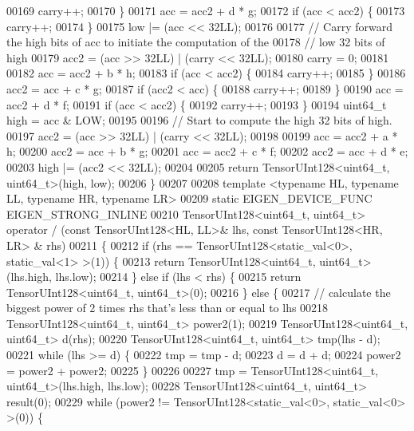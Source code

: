 \begin{DoxyCode}
00169     carry++;
00170   \}
00171   acc = acc2 + d * g;
00172   \textcolor{keywordflow}{if} (acc < acc2) \{
00173     carry++;
00174   \}
00175   low |= (acc << 32LL);
00176 
00177   \textcolor{comment}{// Carry forward the high bits of acc to initiate the computation of the}
00178   \textcolor{comment}{// low 32 bits of high}
00179   acc2 = (acc >> 32LL) | (carry << 32LL);
00180   carry = 0;
00181 
00182   acc = acc2 + b * h;
00183   \textcolor{keywordflow}{if} (acc < acc2) \{
00184     carry++;
00185   \}
00186   acc2 = acc + c * g;
00187   \textcolor{keywordflow}{if} (acc2 < acc) \{
00188     carry++;
00189   \}
00190   acc = acc2 + d * f;
00191   \textcolor{keywordflow}{if} (acc < acc2) \{
00192     carry++;
00193   \}
00194   uint64\_t high = acc & LOW;
00195 
00196   \textcolor{comment}{// Start to compute the high 32 bits of high.}
00197   acc2 = (acc >> 32LL) | (carry << 32LL);
00198 
00199   acc = acc2 + a * h;
00200   acc2 = acc + b * g;
00201   acc = acc2 + c * f;
00202   acc2 = acc + d * e;
00203   high |= (acc2 << 32LL);
00204 
00205   \textcolor{keywordflow}{return} TensorUInt128<uint64\_t, uint64\_t>(high, low);
00206 \}
00207 
00208 \textcolor{keyword}{template} <\textcolor{keyword}{typename} HL, \textcolor{keyword}{typename} LL, \textcolor{keyword}{typename} HR, \textcolor{keyword}{typename} LR>
00209 \textcolor{keyword}{static} EIGEN\_DEVICE\_FUNC EIGEN\_STRONG\_INLINE
00210 TensorUInt128<uint64\_t, uint64\_t> operator / (\textcolor{keyword}{const} TensorUInt128<HL, LL>& lhs, \textcolor{keyword}{const} TensorUInt128<HR, LR>
      & rhs)
00211 \{
00212   \textcolor{keywordflow}{if} (rhs == TensorUInt128<static\_val<0>, static\_val<1> >(1)) \{
00213     \textcolor{keywordflow}{return} TensorUInt128<uint64\_t, uint64\_t>(lhs.high, lhs.low);
00214   \} \textcolor{keywordflow}{else} \textcolor{keywordflow}{if} (lhs < rhs) \{
00215     \textcolor{keywordflow}{return} TensorUInt128<uint64\_t, uint64\_t>(0);
00216   \} \textcolor{keywordflow}{else} \{
00217     \textcolor{comment}{// calculate the biggest power of 2 times rhs that's less than or equal to lhs}
00218     TensorUInt128<uint64\_t, uint64\_t> power2(1);
00219     TensorUInt128<uint64\_t, uint64\_t> d(rhs);
00220     TensorUInt128<uint64\_t, uint64\_t> tmp(lhs - d);
00221     \textcolor{keywordflow}{while} (lhs >= d) \{
00222       tmp = tmp - d;
00223       d = d + d;
00224       power2 = power2 + power2;
00225     \}
00226 
00227     tmp = TensorUInt128<uint64\_t, uint64\_t>(lhs.high, lhs.low);
00228     TensorUInt128<uint64\_t, uint64\_t> result(0);
00229     \textcolor{keywordflow}{while} (power2 != TensorUInt128<static\_val<0>, static\_val<0> >(0)) \{

\end{DoxyCode}
